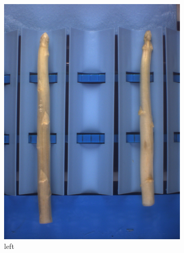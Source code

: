 \begin{figure}[h]
	\centering
	\vspace{20pt}
	\begin{subfigure}{0.3\textwidth}
		\includegraphics[width=0.9\linewidth]{Figures/chapter02/querdel_a.png}
		\caption{left}
	\end{subfigure}
	\begin{subfigure}{0.3\textwidth}

\end{subfigure}
\end{figure}

